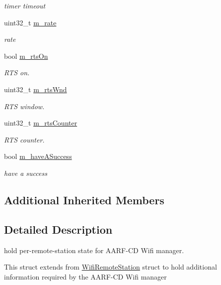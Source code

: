\begin{DoxyCompactItemize}
\begin{DoxyCompactList}\small\item\em timer timeout \end{DoxyCompactList}\item 
uint32\+\_\+t \hyperlink{structns3_1_1AarfcdWifiRemoteStation_a5ab3fa74997c51954091a99073fc6e36}{m\+\_\+rate}
\begin{DoxyCompactList}\small\item\em rate \end{DoxyCompactList}\item 
bool \hyperlink{structns3_1_1AarfcdWifiRemoteStation_ab9c2e6f3f94dd2adebdd8b03eb6db728}{m\+\_\+rts\+On}
\begin{DoxyCompactList}\small\item\em R\+TS on. \end{DoxyCompactList}\item 
uint32\+\_\+t \hyperlink{structns3_1_1AarfcdWifiRemoteStation_a9dfe63f0b12e0809cafbabbe1e1af3e2}{m\+\_\+rts\+Wnd}
\begin{DoxyCompactList}\small\item\em R\+TS window. \end{DoxyCompactList}\item 
uint32\+\_\+t \hyperlink{structns3_1_1AarfcdWifiRemoteStation_a137531633d20efc5c502d29326d65470}{m\+\_\+rts\+Counter}
\begin{DoxyCompactList}\small\item\em R\+TS counter. \end{DoxyCompactList}\item 
bool \hyperlink{structns3_1_1AarfcdWifiRemoteStation_ac99619068b1b13b54283f84e20ccbad5}{m\+\_\+have\+A\+Success}
\begin{DoxyCompactList}\small\item\em have a success \end{DoxyCompactList}\end{DoxyCompactItemize}
\subsection*{Additional Inherited Members}


\subsection{Detailed Description}
hold per-\/remote-\/station state for A\+A\+R\+F-\/\+CD Wifi manager. 

This struct extends from \hyperlink{structns3_1_1WifiRemoteStation}{Wifi\+Remote\+Station} struct to hold additional information required by the A\+A\+R\+F-\/\+CD Wifi manager 

